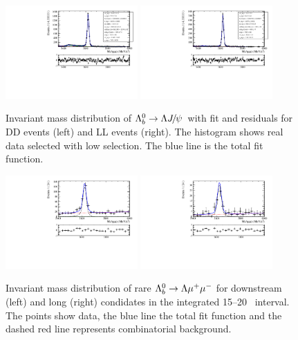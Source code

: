 \begin{figure}
\centering
\includegraphics[width=0.45\textwidth]{Lmumu/figs/MassFits/Lb2JpsiL_lowSel_DD_data_fitAndRes.pdf}
\includegraphics[width=0.45\textwidth]{Lmumu/figs/MassFits/Lb2JpsiL_lowSel_LL_data_fitAndRes.pdf}
\caption{Invariant mass distribution of $\Lb\ra\Lz\jpsi$ with fit and residuals for DD events (left) and LL events (right).
The histogram shows real data selected with low \qsq selection. The blue line is the total fit function.}
\label{fig:Lb_totalFit_low}
\end{figure}
%
\begin{figure}
\centering
\includegraphics[width=0.45\textwidth]{Lmumu/figs/MassFits/Lb2Lmumu_DD_highQ2_fitAndRes.pdf}
\includegraphics[width=0.45\textwidth]{Lmumu/figs/MassFits/Lb2Lmumu_LL_highQ2_fitAndRes.pdf}
\caption{Invariant mass distribution of rare $\Lambda^0_b\rightarrow\Lambda\mu^+\mu^-$ for downstream (left) and long (right) condidates
in the integrated 15--20 \gevgevcccc ~\qsq interval. The points show data, the blue line
the total fit function and the dashed red line represents combinatorial background.}
\label{fig:Lb_totalFitRare}
\end{figure}
